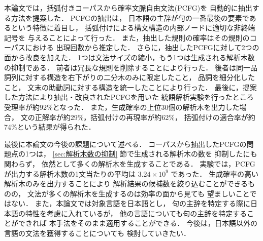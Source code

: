本論文では，括弧付きコーパスから確率文脈自由文法(PCFG)を
自動的に抽出する方法を提案した．
PCFGの抽出は，
日本語の主辞が句の一番最後の要素であるという特徴に着目し，
括弧付けによる構文構造の内部ノードに適切な非終端記号を
与えることによって行った．
また，抽出した規則の確率はその規則のコーパスにおける
出現回数から推定した．
さらに，抽出したPCFGに対して2つの面から改良を加えた．
1つは文法サイズの縮小，もう1つは生成される解析木数の抑制である．
前者は冗長な規則を削除することにより行った．
後者は同一品詞列に対する構造を右下がりの二分木のみに限定したこと，
品詞を細分化したこと，
文末の助動詞に対する構造を統一したことにより行った．
最後に，提案した方法により抽出・改良されたPCFGを用いた
統語解析実験を行ったところ受理率が約92\%となった．
また，生成確率の上位30個の解析木を出力した場合，
文の正解率が約29\%，括弧付けの再現率が約62\%，
括弧付けの適合率が約74\%という結果が得られた．

最後に本論文の今後の課題について述べる．
コーパスから抽出したPCFGの問題点の1つは，
\ref{sec:解析木数の抑制} 節で生成される解析木の数を
抑制したにも関わらず，
依然として多くの解析木を生成することである．
実験では，PCFGが出力する解析木数の1文当たりの平均は
$3.24 \times 10^9$ であった．
生成確率の高い解析木のみを出力することにより
解析結果の候補数を絞り込むことができるものの，
文法が多くの解析木を生成するのは効率の面から見ても
望ましいことではない．
また，本論文では対象言語を日本語とし，
句の主辞を特定する際に日本語の特性を考慮に入れているが，
他の言語についても句の主辞を特定することができれば
本手法をそのまま適用することができる．
今後は，日本語以外の言語の文法を獲得することについても
検討していきたい．







\begin{biography}




\end{biography}


